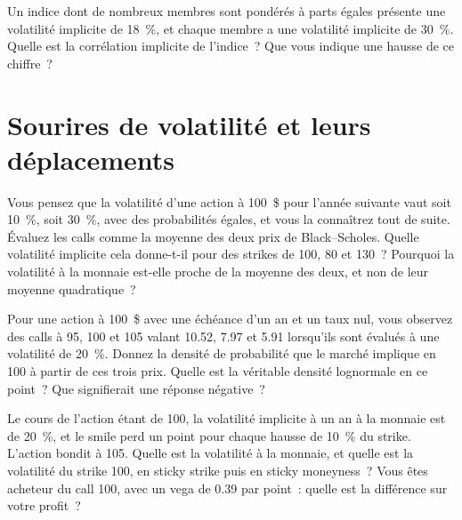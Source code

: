 \begin{question}\label{iq:iv2:vol-surface-and-vol-trading:9}
Un indice dont de nombreux membres sont pondérés à parts égales présente une volatilité implicite de 18~\%, et chaque membre a une volatilité implicite de 30~\%. Quelle est la corrélation implicite de l'indice~? Que vous indique une hausse de ce chiffre~?
\end{question}

\section{Sourires de volatilité et leurs déplacements}

\begin{question}\label{iq:iv2:vol-surface-and-vol-trading:10}
Vous pensez que la volatilité d'une action à 100~\$ pour l'année suivante vaut soit 10~\%, soit 30~\%, avec des probabilités égales, et vous la connaîtrez tout de suite. Évaluez les calls comme la moyenne des deux prix de Black--Scholes. Quelle volatilité implicite cela donne-t-il pour des strikes de 100, 80 et 130~? Pourquoi la volatilité à la monnaie est-elle proche de la moyenne des deux, et non de leur moyenne quadratique~?
\end{question}

\begin{question}\label{iq:iv2:vol-surface-and-vol-trading:11}
Pour une action à 100~\$ avec une échéance d'un an et un taux nul, vous observez des calls à 95, 100 et 105 valant 10.52, 7.97 et 5.91 lorsqu'ils sont évalués à une volatilité de 20~\%. Donnez la densité de probabilité que le marché implique en 100 à partir de ces trois prix. Quelle est la véritable densité lognormale en ce point~? Que signifierait une réponse négative~?
\end{question}

\begin{question}\label{iq:iv2:vol-surface-and-vol-trading:12}
Le cours de l'action étant de 100, la volatilité implicite à un an à la monnaie est de 20~\%, et le smile perd un point pour chaque hausse de 10~\% du strike. L'action bondit à 105. Quelle est la volatilité à la monnaie, et quelle est la volatilité du strike 100, en sticky strike puis en sticky moneyness~? Vous êtes acheteur du call 100, avec un vega de 0.39 par point~: quelle est la différence sur votre profit~?
\end{question}

